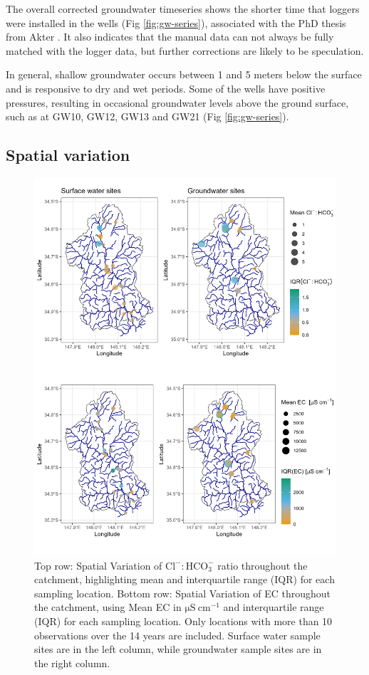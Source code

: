 \documentclass[, manuscript]{copernicus}
\begin{document}
The overall corrected groundwater timeseries shows the shorter time that
loggers were installed in the wells (Fig \ref{fig:gw-series}),
associated with the PhD thesis from Akter \citeyearpar{Akter2018}. It
also indicates that the manual data can not always be fully matched with
the logger data, but further corrections are likely to be speculation.

In general, shallow groundwater occurs between 1 and 5 meters below the
surface and is responsive to dry and wet periods. Some of the wells have
positive pressures, resulting in occasional groundwater levels above the
ground surface, such as at GW10, GW12, GW13 and GW21 (Fig
\ref{fig:gw-series}).

\subsection{Spatial variation}

\clearpage

\begin{figure}
\includegraphics[width=0.8\linewidth]{Figures/spatial_maps} \caption{Top row: Spatial Variation of $\mathrm{Cl^-:HCO_3^-}$ ratio throughout the catchment, highlighting mean and interquartile range (IQR) for each sampling location. Bottom row: Spatial Variation of EC throughout the catchment, using Mean EC in $\mathrm{\mu S~cm^{-1}}$ and interquartile range (IQR) for each sampling location. Only locations with more than 10 observations over the 14 years are included. Surface water sample sites are in the left column, while groundwater sample sites are in the right column.}\label{fig:spatial-map}
\end{figure}
\end{document}
